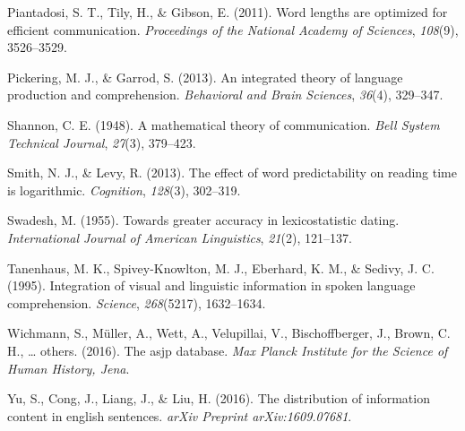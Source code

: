 \documentclass[10pt, letterpaper]{article}
\begin{document}
\leavevmode\hypertarget{ref-piantadosi2011}{}%
Piantadosi, S. T., Tily, H., \& Gibson, E. (2011). Word lengths are
optimized for efficient communication. \emph{Proceedings of the National
Academy of Sciences}, \emph{108}(9), 3526--3529.

\leavevmode\hypertarget{ref-pickering2013}{}%
Pickering, M. J., \& Garrod, S. (2013). An integrated theory of language
production and comprehension. \emph{Behavioral and Brain Sciences},
\emph{36}(4), 329--347.

\leavevmode\hypertarget{ref-shannon1948}{}%
Shannon, C. E. (1948). A mathematical theory of communication.
\emph{Bell System Technical Journal}, \emph{27}(3), 379--423.

\leavevmode\hypertarget{ref-smith2013}{}%
Smith, N. J., \& Levy, R. (2013). The effect of word predictability on
reading time is logarithmic. \emph{Cognition}, \emph{128}(3), 302--319.

\leavevmode\hypertarget{ref-swadesh1955}{}%
Swadesh, M. (1955). Towards greater accuracy in lexicostatistic dating.
\emph{International Journal of American Linguistics}, \emph{21}(2),
121--137.

\leavevmode\hypertarget{ref-tanenhaus1995}{}%
Tanenhaus, M. K., Spivey-Knowlton, M. J., Eberhard, K. M., \& Sedivy, J.
C. (1995). Integration of visual and linguistic information in spoken
language comprehension. \emph{Science}, \emph{268}(5217), 1632--1634.

\leavevmode\hypertarget{ref-wichmann2016}{}%
Wichmann, S., Müller, A., Wett, A., Velupillai, V., Bischoffberger, J.,
Brown, C. H., \ldots{} others. (2016). The asjp database. \emph{Max
Planck Institute for the Science of Human History, Jena}.

\leavevmode\hypertarget{ref-yu2016}{}%
Yu, S., Cong, J., Liang, J., \& Liu, H. (2016). The distribution of
information content in english sentences. \emph{arXiv Preprint
arXiv:1609.07681}.


\end{document}
